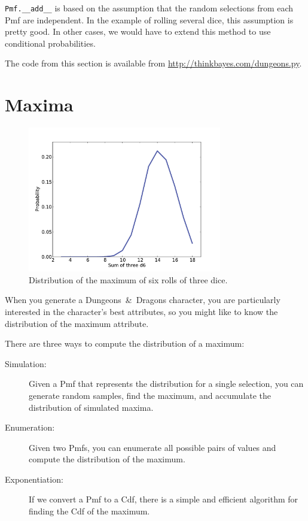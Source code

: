 \documentclass[12pt]{book}
\begin{document}
\verb"Pmf.__add__" is based on the assumption that the random
selections from each Pmf are independent.  In the example of rolling
several dice, this assumption is pretty good.  In other cases, we
would have to extend this method to use conditional probabilities.

The code from this section is available from
\url{http://thinkbayes.com/dungeons.py}.


\section{Maxima}

\begin{figure}
\centerline{\includegraphics[height=2.5in]{figs/dungeons2.pdf}}
\caption{Distribution of the maximum of six rolls of three dice.}
\label{fig.dungeons2}
\end{figure}

When you generate a Dungeons~\&~Dragons character, you are
particularly interested in the character's best attributes, so
you might like to know the
distribution of the maximum attribute.

There are three ways to compute the distribution of a maximum:

\begin{description}

\item[Simulation:] Given a Pmf that represents the distribution
for a single selection, you can generate random samples, find the maximum,
and accumulate the distribution of simulated maxima.

\item[Enumeration:] Given two Pmfs, you can enumerate all possible
pairs of values and compute the distribution of the maximum.

\item[Exponentiation:] If we convert a Pmf to a Cdf, there is a simple
and efficient algorithm for finding the Cdf of the maximum.

\end{description}
\end{document}
